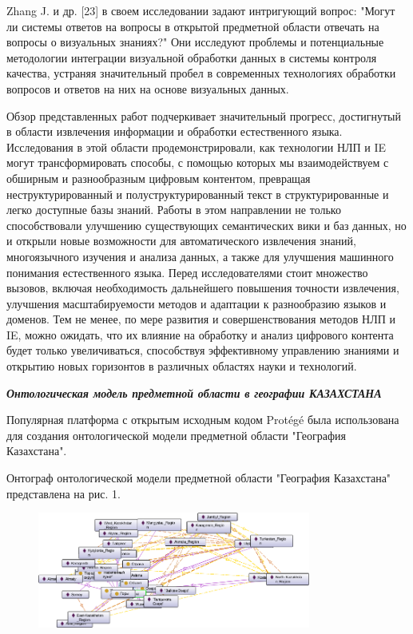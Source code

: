 Zhang J. и др. {[}23{]} в своем исследовании задают интригующий вопрос:
"Могут ли системы ответов на вопросы в открытой предметной области
отвечать на вопросы о визуальных знаниях?" Они исследуют проблемы и
потенциальные методологии интеграции визуальной обработки данных в
системы контроля качества, устраняя значительный пробел в современных
технологиях обработки вопросов и ответов на них на основе визуальных
данных.

Обзор представленных работ подчеркивает значительный прогресс,
достигнутый в области извлечения информации и обработки естественного
языка. Исследования в этой области продемонстрировали, как технологии
НЛП и IE могут трансформировать способы, с помощью которых мы
взаимодействуем с обширным и разнообразным цифровым контентом, превращая
неструктурированный и полуструктурированный текст в структурированные и
легко доступные базы знаний. Работы в этом направлении не только
способствовали улучшению существующих семантических вики и баз данных,
но и открыли новые возможности для автоматического извлечения знаний,
многоязычного изучения и анализа данных, а также для улучшения машинного
понимания естественного языка. Перед исследователями стоит множество
вызовов, включая необходимость дальнейшего повышения точности
извлечения, улучшения масштабируемости методов и адаптации к
разнообразию языков и доменов. Тем не менее, по мере развития и
совершенствования методов НЛП и IE, можно ожидать, что их влияние на
обработку и анализ цифрового контента будет только увеличиваться,
способствуя эффективному управлению знаниями и открытию новых горизонтов
в различных областях науки и технологий.

\emph{\textbf{Онтологическая модель предметной области в географии
КАЗАХСТАНА}}

Популярная платформа с открытым исходным кодом Protégé была использована
для создания онтологической модели предметной области "География
Казахстана".

Онтограф онтологической модели предметной области "География Казахстана"
представлена на рис. 1.

\begin{figure}[H]
	\centering
	\includegraphics[width=0.8\textwidth]{assets/38}
	\caption*{}
\end{figure}

